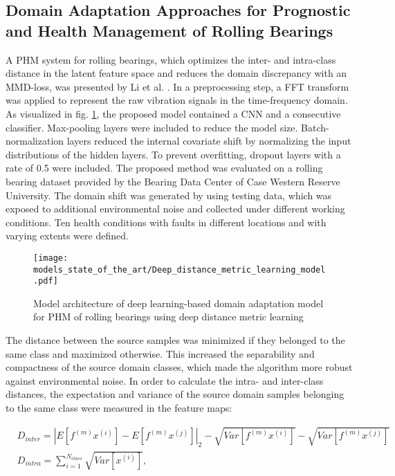 \subsection{Domain Adaptation Approaches for Prognostic and Health Management of Rolling Bearings}

A PHM system for rolling bearings, which optimizes the inter- and intra-class distance in the latent feature space and reduces the domain discrepancy with an MMD-loss, was presented by Li et al. \cite{Li2018}. In a preprocessing step, a FFT transform was applied to represent the raw vibration signals in the time-frequency domain. As visualized in fig. \ref{fig:Deep_distance_metric_learning_model}, the proposed model contained a CNN and a consecutive classifier. Max-pooling layers were included to reduce the model size. Batch-normalization layers reduced the internal covariate shift by normalizing the input distributions of the hidden layers. To prevent overfitting, dropout layers with a rate of 0.5 were included. The proposed method was evaluated on a rolling bearing dataset provided by the Bearing Data Center of Case Western Reserve University. The domain shift was generated by using testing data, which was exposed to additional environmental noise and collected under different working conditions. Ten health conditions with faults in different locations and with varying extents were defined. 

\begin{figure}[H]
  \centering
  \texttt{[image: models\_state\_of\_the\_art/Deep\_distance\_metric\_learning\_model.pdf]}
  \caption{Model architecture of deep learning-based domain adaptation model for PHM of rolling bearings using deep distance metric learning \cite{Li2018}}
  \label{fig:Deep_distance_metric_learning_model}
\end{figure}

The distance between the source samples was minimized if they belonged to the same class and maximized otherwise. This increased the separability and compactness of the source domain classes, which made the algorithm more robust against environmental noise. In order to calculate the intra- and inter-class distances, the expectation and variance of the source domain samples belonging to the same class were measured in the feature maps:

\begin{equation}
    \begin{aligned}
       &D_{inter} = |E[f^{(m)}x^{(i)}]-E[f^{(m)}x^{(j)}]|_{2}-\sqrt{Var[f^{(m)}x^{(i)}]}-\sqrt{Var[f^{(m)}x^{(j)}]}\\
       &D_{intra} = 
        \sum_{i=1}^{N_{class}} \sqrt{Var[x^{(i)}]},
    \end{aligned}
\end{equation}

